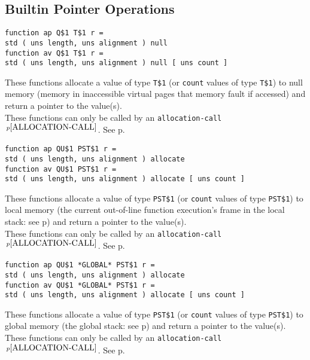 \documentclass[12pt]{article}
\newcommand{\pagref}[1]{p\pageref{#1}}
\newcommand{\pagnote}[1]{$\,^{p\pageref{#1}}$}
\newenvironment{indpar}[1][0.3in]%
	{\begin{list}{}%
		     {\setlength{\itemsep}{0in}%
		      \setlength{\topsep}{0in}%
		      \setlength{\parsep}{1ex}%
		      \setlength{\labelwidth}{#1}%
		      \setlength{\leftmargin}{#1}%
		      \addtolength{\leftmargin}{\labelsep}}%
	 \item}%
	{\end{list}}
\begin{document}
\subsection{Builtin Pointer Operations}
\label{BUILTIN-POINTER-OPERATIONS}

{\tt function ap Q\$1  T\$1 r = \\
\hspace*{1in}std ( uns length, uns alignment ) null}%
\label{NULL} \\
{\tt function av Q\$1  T\$1 r = \\
\hspace*{1in}std ( uns length, uns alignment ) null [ uns count ]}
\begin{indpar}
These functions allocate a value of type {\tt T\$1}
(or {\tt count} values of type {\tt T\$1}) to null
memory (memory in inaccessible virtual pages that memory fault if
accessed)
and return a pointer to the value(s).
\\[1ex]
These functions can only be called by an
{\tt allocation-call}\pagnote{ALLOCATION-CALL}.
See \pagref{ALLOCATION-CALLS}.
\end{indpar}

{\tt function ap QU\$1  PST\$1 r = \\
\hspace*{1in}std ( uns length, uns alignment ) allocate}%
\label{LOCAL} \\
{\tt function av QU\$1  PST\$1 r = \\
\hspace*{1in}std ( uns length, uns alignment ) allocate [ uns count ]}
\begin{indpar}
These functions allocate a value of type {\tt PST\$1}
(or {\tt count} values of type {\tt PST\$1}) to local
memory (the current out-of-line function execution's frame in the local stack:
see \pagref{OUT-OF-LINE-LOCALS})
and return a pointer to the value(s).
\\[1ex]
These functions can only be called by an
{\tt allocation-call}\pagnote{ALLOCATION-CALL}.
See \pagref{ALLOCATION-CALLS}.
\end{indpar}

{\tt function ap QU\$1 *GLOBAL* PST\$1 r = \\
\hspace*{1in}std ( uns length, uns alignment ) allocate}%
\label{GLOBAL} \\
{\tt function av QU\$1 *GLOBAL* PST\$1 r = \\
\hspace*{1in}std ( uns length, uns alignment ) allocate [ uns count ]}
\begin{indpar}
These functions allocate a value of type {\tt PST\$1}
(or {\tt count} values of type {\tt PST\$1}) to global
memory (the global stack: see \pagref{GLOBAL-MEMORY})
and return a pointer to the value(s).
\\[1ex]
These functions can only be called by an
{\tt allocation-call}\pagnote{ALLOCATION-CALL}.
See \pagref{ALLOCATION-CALLS}.
\end{indpar}
\end{document}
